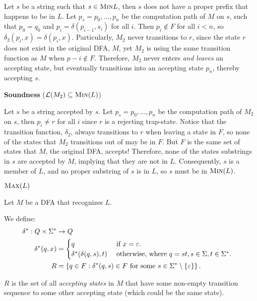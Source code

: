 \begin{problem}
\begin{Answer}
\begin{enumalph}
\begin{enumroman}
            Let $s$ be a string such that $s \in \textsc{Min}{L}$,
            then $s$ does not have a proper prefix that happens to be in $L$.
            Let $p_s = p_0, \ldots, p_n$ be the computation path of $M$ on $s$,
            such that $p_0 = q_0$ and $p_i = \delta(p_{i-1}, s_i)$ for all $i$.
            Then $p_i \notin F$ for all $i<n$, so $\delta_2(p_i, x) = \delta(p_i, x)$.
            Particularly, $M_2$ never transitions to $r$, since the state $r$ 
            does not exist in the original DFA, $M$, yet $M_2$ is using the same transition
            function as $M$ when $p-i \notin F$.
            Therefore, $M_2$ never enters \emph{and leaves} an accepting state,
            but eventually transitions into an accepting state $p_n$, thereby accepting $s$.
            \item \textbf{Soundness} ($\mathcal{L}(M_2) \subseteq \textsc{Min}(L)$)
          
            Let $s$ be a string accepted by $s$.
            Let $p_s = p_0, \ldots, p_n$ be the computation path of $M_2$ on $s$,
            then $p_i \ne r$ for all $i$ since $r$ is a rejecting trap-state.
            Notice that the transition function, $\delta_2$, always transitions
            to $r$ when leaving a state in $F$, so none of the states that
            $M_2$ transitions out of may be in $F$.
            But $F$ is the same set of states that $M$, the original DFA, accepts!
            Therefore, none of the states substrings in $s$ are accepted by $M$,
            implying that they are not in $L$.
            Consequently, $s$ is a member of $L$, and no proper substring
            of $s$ is in $L$, so $s$ must be in $\textsc{Min}(L)$.
        \end{enumroman}
      \newpage
      \item $\textsc{Max}(L)$
      
      \step
      Let $M$ be a DFA that recognizes $L$.

      We define:
      \begin{align*}
        \delta^* : Q \times \Sigma^* &\to Q \\
        \delta^*(q, x) &= \begin{cases}
          q &\text{ if $x = \varepsilon$. }\\
          \delta^*(\delta(q, s), t) &\text{ otherwise, where $q = st, s \in \Sigma, t \in \Sigma^*$. } \\
        \end{cases}\\
        R &= \left\{q \in F : \delta^*(q, s) \in F \text{ for some } s \in \Sigma^* \setminus \left\{\varepsilon\right\}\right\}.
      \end{align*}
      \begin{observation}
        $R$ is the set of all \emph{accepting states} in $M$
        that have some non-empty transition sequence to some other accepting state
        (which could be the same state).
      \end{observation}


\end{enumalph}
\end{Answer}
\end{problem}
